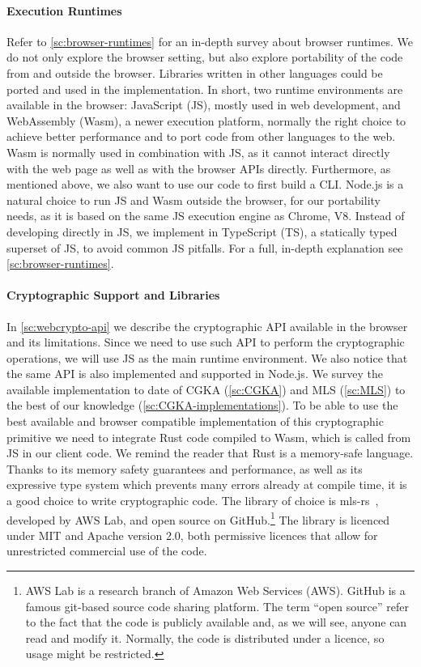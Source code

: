 \paragraph{Execution Runtimes} 
Refer to \cref{sc:browser-runtimes} for an in-depth survey about browser runtimes.
We do not only explore the browser setting, but also explore
portability of the code from and outside the browser.
Libraries written in other languages could be ported and used in the implementation.
In short, two runtime environments are available in the browser:
JavaScript (JS), mostly used in web development, and WebAssembly (Wasm),
a newer execution platform, normally the right choice to achieve better performance
and to port code from other languages to the web. Wasm is normally
used in combination with JS, as it cannot interact directly with
the web page as well as with the browser APIs directly. Furthermore, 
as mentioned above, we also want to use our code to first build a CLI.
Node.js is a natural choice to run JS and Wasm outside the browser,
for our portability needs, as it is based on the same 
JS execution engine as Chrome, V8.
Instead of developing directly in JS, we implement in TypeScript (TS),
a statically typed superset of JS, to avoid common JS pitfalls.
For a full, in-depth explanation see \cref{sc:browser-runtimes}.

\paragraph{Cryptographic Support and Libraries}
In \cref{sc:webcrypto-api} we describe the cryptographic API
available in the browser and its limitations. Since we need to use
such API to perform the cryptographic operations, we will use JS
as the main runtime environment.
We also notice that the same API is also implemented and supported in Node.js.
We survey the available 
implementation to date of CGKA 
(\cref{sc:CGKA}) and MLS (\cref{sc:MLS})
to the best of our knowledge (\cref{sc:CGKA-implementations}).
To be able to use the best available
and browser compatible implementation of this cryptographic
primitive we need to integrate Rust code compiled to Wasm, which is
called from JS in our client code. We remind the reader that
Rust is a memory-safe language.
Thanks to its memory safety guarantees and performance,
as well as its expressive type system which prevents many errors already at compile time,
it is a good choice to write cryptographic code.
The library of choice is mls-rs~\cite{AWSMLSGroup}, developed by AWS Lab, 
and open source on GitHub.\footnote{AWS Lab is a research branch of Amazon Web Services (AWS). GitHub is a famous git-based source code sharing platform. The term ``open source'' refer to the fact that the code is publicly available and, as we will see, anyone can read and modify it. Normally, the code is distributed under a licence, so usage might be restricted.}
The library is licenced under MIT and Apache version 2.0, both
permissive licences that allow for unrestricted commercial use of the code.

